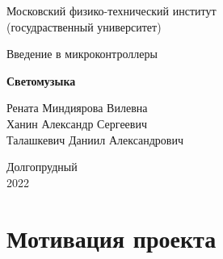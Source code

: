 \documentclass[a4paper, 12pt]{article}%
\begin{document}


\begin{titlepage}

	\newpage
	\begin{center}
		\normalsize Московский физико-технический институт \\(госудраственный 			университет)
	\end{center}

	\vspace{6em}

	\begin{center}
		\Large Введение в микроконтроллеры\\
	\end{center}

	\vspace{1em}

	\begin{center}
		\large \textbf{Светомузыка}
	\end{center}

	\vspace{2em}

	\begin{center}
		\large Рената Миндиярова Вилевна \\
			Ханин Александр Сергеевич \\
			Талашкевич Даниил Александрович \\
				
				
	\end{center}

	\vspace{\fill}

	\begin{center}
	Долгопрудный \\2022
	\end{center}
	
\end{titlepage}



	\thispagestyle{empty}
	\newpage
	\tableofcontents
	\newpage
	\setcounter{page}{1}


					
\section{Мотивация проекта}
\end{document}
